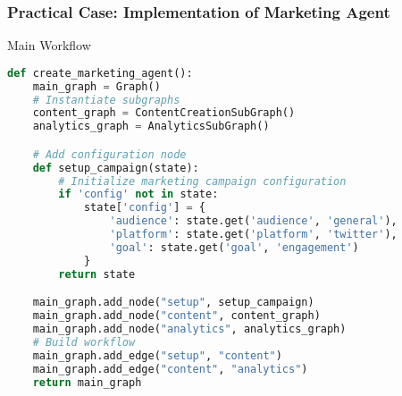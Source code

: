 \begin{frame}[fragile]\frametitle{Practical Case: Implementation of Marketing Agent}

Main Workflow

\begin{lstlisting}[language=Python, basicstyle=\tiny]
def create_marketing_agent():
    main_graph = Graph()
    # Instantiate subgraphs
    content_graph = ContentCreationSubGraph()
    analytics_graph = AnalyticsSubGraph()

    # Add configuration node
    def setup_campaign(state):
        # Initialize marketing campaign configuration
        if 'config' not in state:
            state['config'] = {
                'audience': state.get('audience', 'general'),
                'platform': state.get('platform', 'twitter'),
                'goal': state.get('goal', 'engagement')
            }
        return state

    main_graph.add_node("setup", setup_campaign)
    main_graph.add_node("content", content_graph)
    main_graph.add_node("analytics", analytics_graph)
    # Build workflow
    main_graph.add_edge("setup", "content")
    main_graph.add_edge("content", "analytics")
    return main_graph
\end{lstlisting}
\end{frame}

